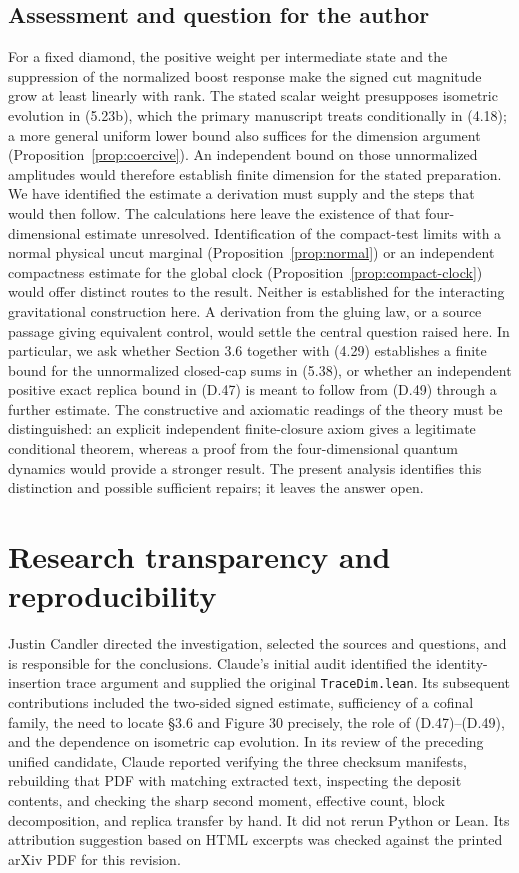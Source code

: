 \documentclass[11pt]{article}
\begin{document}
\subsection{Assessment and question for the author}
For a fixed diamond, the positive weight per intermediate state and the suppression of the normalized boost response make the signed cut magnitude grow at least linearly with rank. The stated scalar weight presupposes isometric evolution in (5.23b), which the primary manuscript treats conditionally in (4.18); a more general uniform lower bound also suffices for the dimension argument (Proposition~\ref{prop:coercive}). An independent bound on those unnormalized amplitudes would therefore establish finite dimension for the stated preparation. We have identified the estimate a derivation must supply and the steps that would then follow. The calculations here leave the existence of that four-dimensional estimate unresolved. Identification of the compact-test limits with a normal physical uncut marginal (Proposition~\ref{prop:normal}) or an independent compactness estimate for the global clock (Proposition~\ref{prop:compact-clock}) would offer distinct routes to the result. Neither is established for the interacting gravitational construction here. A derivation from the gluing law, or a source passage giving equivalent control, would settle the central question raised here. In particular, we ask whether Section 3.6 together with (4.29) establishes a finite bound for the unnormalized closed-cap sums in (5.38), or whether an independent positive exact replica bound in (D.47) is meant to follow from (D.49) through a further estimate. The constructive and axiomatic readings of the theory must be distinguished: an explicit independent finite-closure axiom gives a legitimate conditional theorem, whereas a proof from the four-dimensional quantum dynamics would provide a stronger result. The present analysis identifies this distinction and possible sufficient repairs; it leaves the answer open.

\section*{Research transparency and reproducibility}
Justin Candler directed the investigation, selected the sources and questions, and is responsible for the conclusions. Claude's initial audit identified the identity-insertion trace argument and supplied the original \texttt{TraceDim.lean}. Its subsequent contributions included the two-sided signed estimate, sufficiency of a cofinal family, the need to locate \S3.6 and Figure 30 precisely, the role of (D.47)--(D.49), and the dependence on isometric cap evolution. In its review of the preceding unified candidate, Claude reported verifying the three checksum manifests, rebuilding that PDF with matching extracted text, inspecting the deposit contents, and checking the sharp second moment, effective count, block decomposition, and replica transfer by hand. It did not rerun Python or Lean. Its attribution suggestion based on HTML excerpts was checked against the printed arXiv PDF for this revision.
\end{document}
